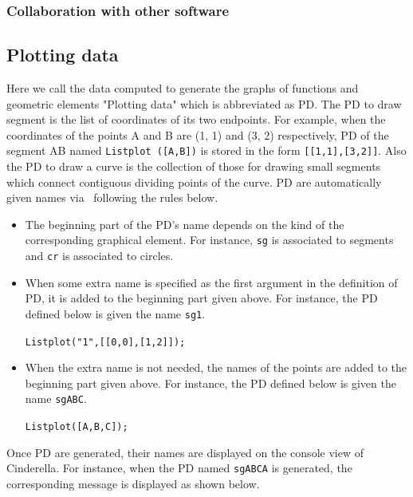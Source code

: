 \documentclass[papersize,a4paper,12pt]{article}
\begin{document}
\subsubsection{Collaboration with other software}


\newpage

\subsection{Plotting data}
Here we call the data computed 
to generate the graphs of functions and geometric elements 
"Plotting data" which is abbreviated as PD. 
The PD to draw segment is the list of coordinates 
of its two endpoints. 
For example, 
when the coordinates of the points A and B 
are (1, 1) and (3, 2) respectively, 
PD of the segment AB named \verb|Listplot ([A,B])| 
is stored in the form \verb|[[1,1],[3,2]]|. 
Also the PD to draw a curve is the collection of 
those for drawing small segments 
which connect contiguous dividing points of the curve. 
PD are automatically given names via \ketcindy\ 
following the rules below.

\begin{itemize}
\item 
The beginning part of the PD's name 
depends on the kind of the corresponding graphical element. 
For instance, 
\verb|sg| is associated to segments and 
\verb|cr| is associated to circles. 

\item 
When some extra name is specified 
as the first argument in the definition of PD, 
it is added to the beginning part given above. 
For instance, the PD defined below 
is given the name \verb|sg1|. 
\begin{center}
\verb|Listplot("1",[[0,0],[1,2]]);| 
\end{center}

\item 
When the extra name is not needed, 
the names of the points are added 
to the beginning part given above. 
For instance, the PD defined below  
is given the name \verb|sgABC|. 
\begin{center}
\verb|Listplot([A,B,C]);|
\end{center}

\end{itemize}

\noindent 
Once PD are generated, 
their names are displayed on the console view of Cinderella. 
For instance, when the PD named \verb|sgABCA| is generated, 
the corresponding message is displayed as shown below. 
\end{document}
